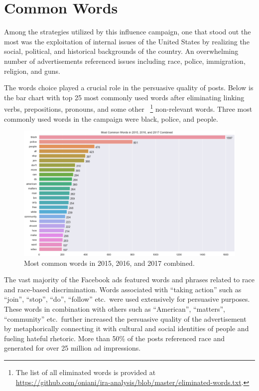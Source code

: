 \documentclass[11pt]{article}
\begin{document}

\section*{\centering Common Words}

Among the strategies utilized by this influence campaign, one that stood out
the most was the exploitation of internal issues of the United States by
realizing the social, political, and historical backgrounds of the country.
An overwhelming number of advertisements referenced issues including race,
police, immigration, religion, and guns.

\bigskip

The words choice played a crucial role in the persuasive quality of posts.
Below is the bar chart with top 25 most commonly used words after eliminating
linking verbs, prepositions, pronouns, and some other
~\footnote{The list of all eliminated words is provided at\\
\url{https://github.com/oniani/ira-analysis/blob/master/eliminated-words.txt}.}
non-relevant words. Three most commonly used words in the campaign were black,
police, and people.

\begin{figure}[H]
\centering
\includegraphics[width=\linewidth]{./image/barchart-plots/barchart_word_counts.png}
\caption{Most common words in 2015, 2016, and 2017 combined.}
\end{figure}

The vast majority of the Facebook ads featured words and phrases related to
race and race-based discrimination. Words associated with ``taking action''
such as ``join'', ``stop'', ``do'', ``follow'' etc.~were used extensively for
persuasive purposes. These words in combination with others such  as ``American'',
``matters'', ``community'' etc.~further increased the persuasive quality of the
advertisement by metaphorically connecting it with cultural and social identities
of people and fueling hateful rhetoric. More than 50\% of the posts referenced
race and generated for over 25 million ad impressions.
\end{document}
